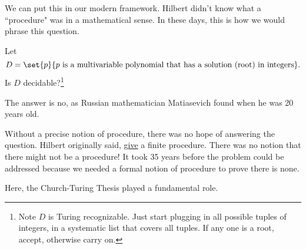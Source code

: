 We can put this in our modern framework. Hilbert didn't know what a ``procedure" was in a mathematical sense. In these days, this is how we would phrase this question.
\begin{prb}
Let 
\[D=\set{p}{p\text{ is a multivariable polynomial that has a solution (root) in integers}}.\]
Is $D$ decidable?\footnote{Note $D$ is Turing recognizable. Just start plugging in all possible tuples of integers, in a systematic list that covers all tuples. If any one is a root, accept, otherwise carry on.}
\end{prb}
The answer is no, as Russian mathematician Matiasevich found when he was 20 years old.


Without a precise notion of procedure, there was no hope of answering the question. Hilbert originally said, \ul{give} a finite procedure. There was no notion that there might not be a procedure! It took 35 years before the problem could be addressed because we needed a formal notion of procedure to prove there is none.

Here, the Church-Turing Thesis played a fundamental role.



